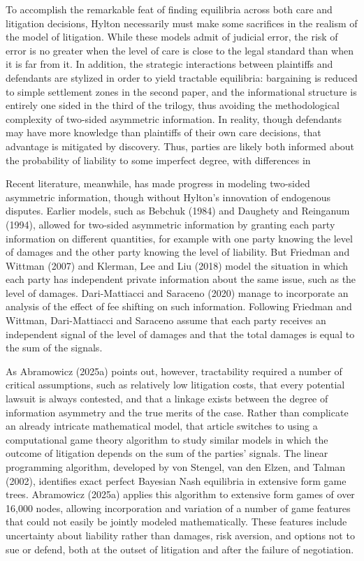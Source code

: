 \documentclass{article}
\begin{document}
To accomplish the remarkable feat of finding equilibria across both care and litigation decisions, Hylton necessarily must make some sacrifices in the realism of the model of litigation. While these models admit of judicial error, the risk of error is no greater when the level of care is close to the legal standard than when it is far from it. In addition, the strategic interactions between plaintiffs and defendants are stylized in order to yield tractable equilibria: bargaining is reduced to simple settlement zones in the second paper, and the informational structure is entirely one sided in the third of the trilogy, thus avoiding the methodological complexity of two-sided asymmetric information. In reality, though defendants may have more knowledge than plaintiffs of their own care decisions, that advantage is mitigated by discovery. Thus, parties are likely both informed about the probability of liability to some imperfect degree, with differences in 

Recent literature, meanwhile, has made progress in modeling two-sided asymmetric information, though without Hylton's innovation of endogenous disputes. Earlier models, such as Bebchuk (1984) and Daughety and Reinganum (1994), allowed for two-sided asymmetric information by granting each party information on different quantities, for example with one party knowing the level of damages and the other party knowing the level of liability. But Friedman and Wittman (2007) and Klerman, Lee and Liu (2018) model the situation in which each party has independent private information about the same issue, such as the level of damages. Dari-Mattiacci and Saraceno (2020) manage to incorporate an analysis of the effect of fee shifting on such information. Following Friedman and Wittman, Dari-Mattiacci and Saraceno assume that each party receives an independent signal of the level of damages and that the total damages is equal to the sum of the signals.

As Abramowicz (2025a) points out, however, tractability required a number of critical assumptions, such as relatively low litigation costs, that every potential lawsuit is always contested, and that a linkage exists between the degree of information asymmetry and the true merits of the case. Rather than complicate an already intricate mathematical model, that article switches to using a computational game theory algorithm to study similar models in which the outcome of litigation depends on the sum of the parties' signals. The linear programming algorithm, developed by von Stengel, van den Elzen, and Talman (2002), identifies exact perfect Bayesian Nash equilibria in extensive form game trees. Abramowicz (2025a) applies this algorithm to extensive form games of over 16,000 nodes, allowing incorporation and variation of a number of game features that could not easily be jointly modeled mathematically. These features include uncertainty about liability rather than damages, risk aversion, and options not to sue or defend, both at the outset of litigation and after the failure of negotiation.
\end{document}
